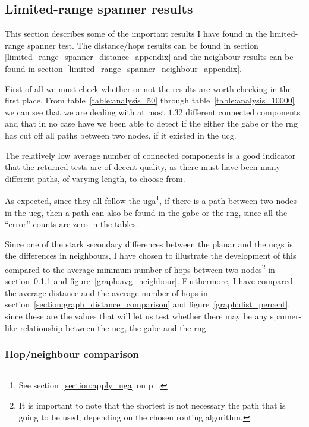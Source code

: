 \subsection{Limited-range spanner results}
\label{section:test_results_spanners}
This section describes some of the important results I have found in the limited-range spanner test. The distance/hops results can be found in section \ref{limited_range_spanner_distance_appendix} and the neighbour results can be found in section~\ref{limited_range_spanner_neighbour_appendix}.

First of all we must check whether or not the results are worth checking in the first place. From table~\ref{table:analysis_50} through table~\ref{table:analysis_10000} we can see that we are dealing with at most $1.32$ different connected components and that in no case have we been able to detect if the either the \ac{gabe} or the \ac{rng} has cut off all paths between two nodes, if it existed in the \ac{ucg}. 

The relatively low average number of connected components is a good indicator that the returned tests are of decent quality, as there must have been many different paths, of varying length, to choose from.

As expected, since they all follow the \ac{uga}\footnote{See section~\ref{section:apply_uga} on p. \pageref{section:apply_uga}.}, if there is a path between two nodes in the \ac{ucg}, then a path can also be found in the \ac{gabe} or the \ac{rng}, since all the ``error'' counts are zero in the tables.

Since one of the stark secondary differences between the planar and the \acp{ucg} is the differences in neighbours, I have chosen to illustrate the development of this compared to the average minimum number of hops between two nodes\footnote{It is important to note that the shortest is not necessary the path that is going to be used, depending on the chosen routing algorithm.} in section~\ref{section:hop_neighbour_comparison} and figure~\ref{graph:avg_neighbour}. Furthermore, I have compared the average distance and the average number of hops in section~\ref{section:graph_distance_comparison} and figure~\ref{graph:dist_percent}, since these are the values that will let us test whether there may be any spanner-like relationship between the \ac{ucg}, the \ac{gabe} and the \ac{rng}.

\subsubsection{Hop/neighbour comparison}
\label{section:hop_neighbour_comparison}


